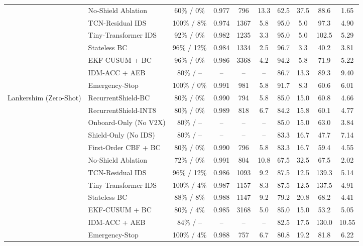 \begin{table}[t]
\begin{tabular}{llcccccccc}
 & No-Shield Ablation & 60\% / 0\% & 0.977 & 796 & 13.3 & 62.5 & 37.5 & 88.6 & 1.65 \\
 & TCN-Residual IDS & 100\% / 8\% & 0.974 & 1367 & 5.8 & 95.0 & 5.0 & 97.3 & 4.90 \\
 & Tiny-Transformer IDS & 92\% / 0\% & 0.982 & 1235 & 3.3 & 95.0 & 5.0 & 102.5 & 5.29 \\
 & Stateless BC & 96\% / 12\% & 0.984 & 1334 & 2.5 & 96.7 & 3.3 & 40.2 & 3.81 \\
 & EKF-CUSUM + BC & 96\% / 0\% & 0.986 & 3368 & 4.2 & 94.2 & 5.8 & 71.9 & 5.22 \\
 & IDM-ACC + AEB & 80\% / -- & -- & -- & -- & 86.7 & 13.3 & 89.3 & 9.40 \\
 & Emergency-Stop & 100\% / 0\% & 0.991 & 981 & 5.8 & 91.7 & 8.3 & 60.6 & 6.01 \\
\midrule
Lankershim (Zero-Shot) & RecurrentShield-BC & 80\% / 0\% & 0.990 & 794 & 5.8 & 85.0 & 15.0 & 60.8 & 4.66 \\
 & RecurrentShield-INT8 & 80\% / 0\% & 0.989 & 818 & 6.7 & 84.2 & 15.8 & 60.1 & 4.77 \\
 & Onboard-Only (No V2X) & 80\% / -- & -- & -- & -- & 85.0 & 15.0 & 63.0 & 3.84 \\
 & Shield-Only (No IDS) & 80\% / -- & -- & -- & -- & 83.3 & 16.7 & 47.7 & 7.14 \\
 & First-Order CBF + BC & 80\% / 0\% & 0.990 & 796 & 5.8 & 83.3 & 16.7 & 59.4 & 4.55 \\
 & No-Shield Ablation & 72\% / 0\% & 0.991 & 804 & 10.8 & 67.5 & 32.5 & 67.5 & 2.02 \\
 & TCN-Residual IDS & 96\% / 12\% & 0.986 & 1093 & 9.2 & 87.5 & 12.5 & 139.3 & 5.14 \\
 & Tiny-Transformer IDS & 100\% / 4\% & 0.987 & 1157 & 8.3 & 87.5 & 12.5 & 137.5 & 4.91 \\
 & Stateless BC & 88\% / 8\% & 0.988 & 1147 & 9.2 & 79.2 & 20.8 & 68.2 & 4.41 \\
 & EKF-CUSUM + BC & 80\% / 4\% & 0.985 & 3168 & 5.0 & 85.0 & 15.0 & 53.2 & 5.05 \\
 & IDM-ACC + AEB & 84\% / -- & -- & -- & -- & 82.5 & 17.5 & 130.0 & 10.55 \\
 & Emergency-Stop & 100\% / 4\% & 0.988 & 757 & 6.7 & 80.8 & 19.2 & 81.8 & 6.22 \\
\bottomrule
\end{tabular}
\end{table}